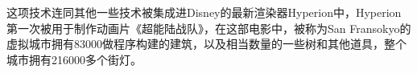 这项技术连同其他一些技术被集成进Disney的最新渲染器Hyperion中，Hyperion第一次被用于制作动画片《超能陆战队》，在这部电影中，被称为San Fransokyo的虚拟城市拥有83000做程序构建的建筑，以及相当数量的一些树和其他道具，整个城市拥有216000多个街灯。



